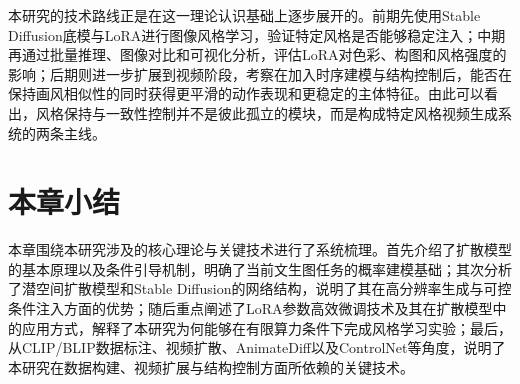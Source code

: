 本研究的技术路线正是在这一理论认识基础上逐步展开的。前期先使用Stable Diffusion底模与LoRA进行图像风格学习，验证特定风格是否能够稳定注入；中期再通过批量推理、图像对比和可视化分析，评估LoRA对色彩、构图和风格强度的影响；后期则进一步扩展到视频阶段，考察在加入时序建模与结构控制后，能否在保持画风相似性的同时获得更平滑的动作表现和更稳定的主体特征。由此可以看出，风格保持与一致性控制并不是彼此孤立的模块，而是构成特定风格视频生成系统的两条主线。

\section{本章小结}

本章围绕本研究涉及的核心理论与关键技术进行了系统梳理。首先介绍了扩散模型的基本原理以及条件引导机制，明确了当前文生图任务的概率建模基础；其次分析了潜空间扩散模型和Stable Diffusion的网络结构，说明了其在高分辨率生成与可控条件注入方面的优势；随后重点阐述了LoRA参数高效微调技术及其在扩散模型中的应用方式，解释了本研究为何能够在有限算力条件下完成风格学习实验；最后，从CLIP/BLIP数据标注、视频扩散、AnimateDiff以及ControlNet等角度，说明了本研究在数据构建、视频扩展与结构控制方面所依赖的关键技术。
